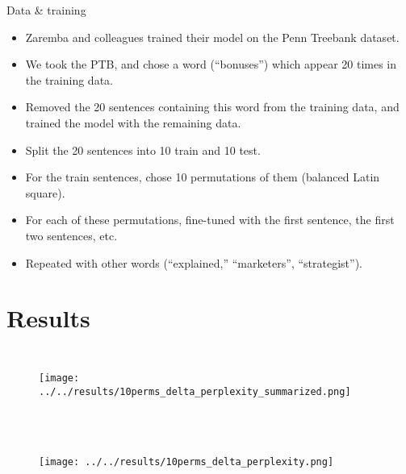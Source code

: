 \documentclass{beamer}
\begin{document}

\begin{frame}{Data \& training}
\begin{itemize}
    \item<1-> Zaremba and colleagues trained their model on the Penn Treebank dataset. 
    \item<2-> We took the PTB, and chose a word (``bonuses'') which appear 20 times in the training data. 
    \item<3-> Removed the 20 sentences containing this word from the training data, and trained the model with the remaining data.
    \item<4-> Split the 20 sentences into 10 train and 10 test.
    \item<5-> For the train sentences, chose 10 permutations of them (balanced Latin square).
    \item<6-> For each of these permutations, fine-tuned with the first sentence, the first two sentences, etc. 
    \item<7-> Repeated with other words (``explained,'' ``marketers'', ``strategist'').
\end{itemize}
\end{frame}

\section{Results}
\begin{frame}
  \begin{columns}
    \column{\dimexpr\paperwidth}
    \begin{figure}
    \texttt{[image: ../../results/10perms\_delta\_perplexity\_summarized.png]}
    \end{figure}
  \end{columns}
\begin{figure}
\end{figure}

\end{frame}
\begin{frame}
  \begin{columns}
    \column{\dimexpr\paperwidth}
    \begin{figure}
    \texttt{[image: ../../results/10perms\_delta\_perplexity.png]}
    \end{figure}
  \end{columns}
\begin{figure}
\end{figure}
\end{frame}
\end{document}
